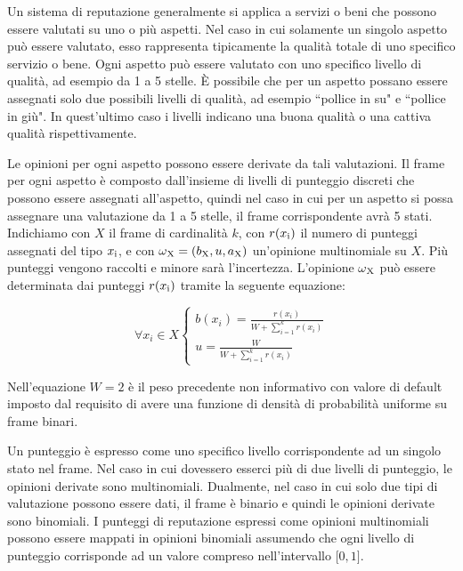 \documentclass{report}
\begin{document}
	Un sistema di reputazione generalmente si applica a servizi o beni che
	possono essere valutati su uno o più aspetti. Nel caso in cui solamente
	un singolo aspetto può essere valutato, esso rappresenta tipicamente la
	qualità totale di uno specifico servizio o bene. Ogni aspetto può essere
	valutato con uno specifico livello di qualità, ad esempio da 1 a 5
	stelle. È possibile che per un aspetto possano essere assegnati solo due
	possibili livelli di qualità, ad esempio ``pollice in su" e ``pollice in
	giù". In quest'ultimo caso i livelli indicano una buona qualità o una
	cattiva qualità rispettivamente.
	
	Le opinioni per ogni aspetto possono essere derivate da tali
	valutazioni. Il frame per ogni aspetto è composto dall'insieme di
	livelli di punteggio discreti che possono essere assegnati all'aspetto,
	quindi nel caso in cui per un aspetto si possa assegnare una valutazione
	da 1 a 5 stelle, il frame corrispondente avrà 5 stati. Indichiamo con $X$
	il frame di cardinalità $k$, con $r(x\textsubscript{i})$ il numero di punteggi assegnati del
	tipo $x\textsubscript{i}$, e con $\omega\textsubscript{X} =(b\textsubscript{X},u,a\textsubscript{X})$ un'opinione multinomiale su $X$. Più punteggi
	vengono raccolti e minore sarà l'incertezza. L'opinione $\omega\textsubscript{X}$ può
	essere determinata dai punteggi $r(x\textsubscript{i})$ tramite la seguente equazione:
	
	\begin{center}
	\begin{equation}
		\forall x_i \in X \begin{cases}
								b(x_i)=\frac{r(x_i)}{W+\sum_{i=1}^k r(x_i)}\\
								u=\frac{W}{W+\sum_{i=1}^k r(x_i)}
							\end{cases}
							\label{equazione5}
	\end{equation}
	\end{center}
	
	
	
	Nell'equazione $W = 2$ è il peso precedente non informativo con valore di
	default imposto dal requisito di avere una funzione di densità di
	probabilità uniforme su frame binari.
	
	Un punteggio è espresso come uno specifico livello corrispondente ad un
	singolo stato nel frame. Nel caso in cui dovessero esserci più di due
	livelli di punteggio, le opinioni derivate sono multinomiali. Dualmente,
	nel caso in cui solo due tipi di valutazione possono essere dati, il
	frame è binario e quindi le opinioni derivate sono binomiali. I punteggi
	di reputazione espressi come opinioni multinomiali possono essere
	mappati in opinioni binomiali assumendo che ogni livello di punteggio
	corrisponde ad un valore compreso nell'intervallo ${[}0,1{]}$.
	
\end{document}
